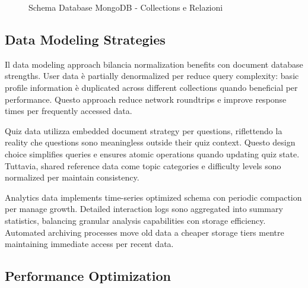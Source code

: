 \documentclass[12pt,a4paper]{article}
\begin{document}
\begin{figure}[H]
\caption{Schema Database MongoDB - Collections e Relazioni}
\label{fig:mongodb-schema}
\end{figure}

\subsection{Data Modeling Strategies}

Il data modeling approach bilancia normalization benefits con document database strengths. User data è partially denormalized per reduce query complexity: basic profile information è duplicated across different collections quando beneficial per performance. Questo approach reduce network roundtrips e improve response times per frequently accessed data.

Quiz data utilizza embedded document strategy per questions, riflettendo la reality che questions sono meaningless outside their quiz context. Questo design choice simplifies queries e ensures atomic operations quando updating quiz state. Tuttavia, shared reference data come topic categories e difficulty levels sono normalized per maintain consistency.

Analytics data implements time-series optimized schema con periodic compaction per manage growth. Detailed interaction logs sono aggregated into summary statistics, balancing granular analysis capabilities con storage efficiency. Automated archiving processes move old data a cheaper storage tiers mentre maintaining immediate access per recent data.

\subsection{Performance Optimization}
\end{document}
